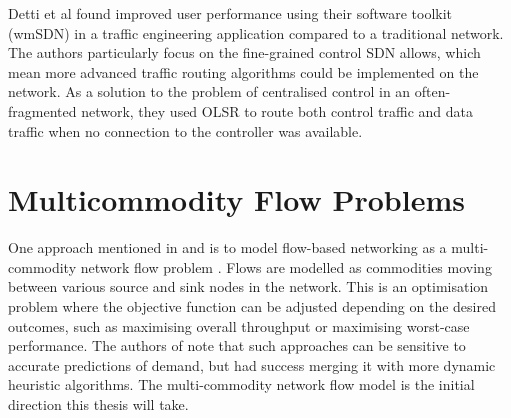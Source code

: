 Detti et al \cite{detti:wmsdn} found improved user performance using their software toolkit (wmSDN) in a traffic engineering application compared to a traditional network. The authors particularly focus on the fine-grained control SDN allows, which mean more advanced traffic routing algorithms could be implemented on the network. As a solution to the problem of centralised control in an often-fragmented network, they used OLSR to route both control traffic and data traffic when no connection to the controller was available.

\section{Multicommodity Flow Problems}
One approach mentioned in \cite{wellons:augmenting} and \cite{dai:dynamic} is to model flow-based networking as a multi-commodity network flow problem \cite[pp. 862--863]{cormen:algorithms}. Flows are modelled as commodities moving between various source and sink nodes in the network. This is an optimisation problem where the objective function can be adjusted depending on the desired outcomes, such as maximising overall throughput or maximising worst-case performance. The authors of \cite{wellons:augmenting} note that such approaches can be sensitive to accurate predictions of demand, but had success merging it with more dynamic heuristic algorithms. The multi-commodity network flow model is the initial direction this thesis will take.
